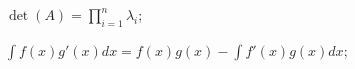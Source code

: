 
\entry
$\det(A) = \prod_{i=1}^n \lambda_i$;

\entry
$\int f(x)g'(x)dx = f(x)g(x) - \int f'(x)g(x)dx$;
